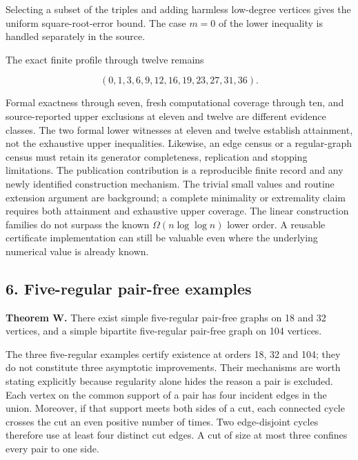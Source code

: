 \documentclass[
  11pt,
]{article}
\begin{document}
Selecting a subset of the triples and adding harmless low-degree
vertices gives the uniform square-root-error bound. The case \(m=0\) of
the lower inequality is handled separately in the source.

The exact finite profile through twelve remains

\[ (0,1,3,6,9,12,16,19,23,27,31,36). \]

Formal exactness through seven, fresh computational coverage through
ten, and source-reported upper exclusions at eleven and twelve are
different evidence classes. The two formal lower witnesses at eleven and
twelve establish attainment, not the exhaustive upper inequalities.
Likewise, an edge census or a regular-graph census must retain its
generator completeness, replication and stopping limitations. The
publication contribution is a reproducible finite record and any newly
identified construction mechanism. The trivial small values and routine
extension argument are background; a complete minimality or extremality
claim requires both attainment and exhaustive upper coverage. The linear
construction families do not surpass the known \(\Omega(n\log\log n)\)
lower order. A reusable certificate implementation can still be valuable
even where the underlying numerical value is already known.

\subsection{6. Five-regular pair-free
examples}\label{five-regular-pair-free-examples}

\textbf{Theorem W.} There exist simple five-regular pair-free graphs on
18 and 32 vertices, and a simple bipartite five-regular pair-free graph
on 104 vertices.

The three five-regular examples certify existence at orders 18, 32 and
104; they do not constitute three asymptotic improvements. Their
mechanisms are worth stating explicitly because regularity alone hides
the reason a pair is excluded. Each vertex on the common support of a
pair has four incident edges in the union. Moreover, if that support
meets both sides of a cut, each connected cycle crosses the cut an even
positive number of times. Two edge-disjoint cycles therefore use at
least four distinct cut edges. A cut of size at most three confines
every pair to one side.
\end{document}

